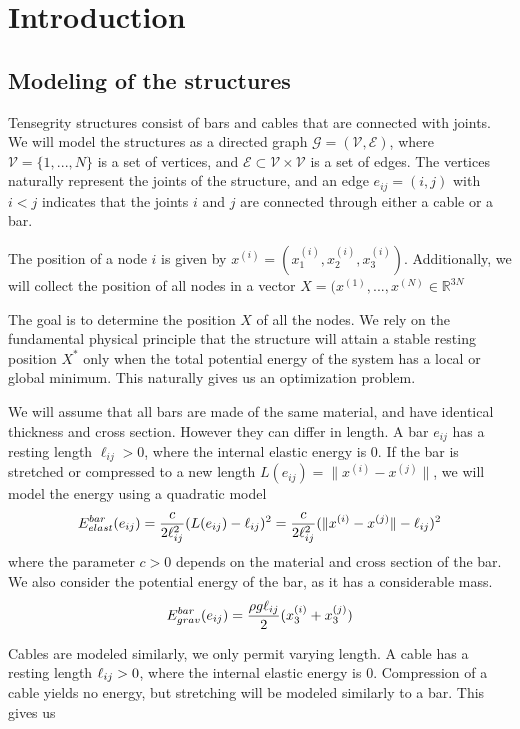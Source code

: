 \section{Introduction}
\subsection{Modeling of the structures}
Tensegrity structures consist of bars and cables that are connected with joints. We will model the structures as a directed graph $\mathcal{G} = (\mathcal{V},\mathcal{E})$, where $\mathcal{V} = \{1,...,N\}$ is a set of vertices, and $\mathcal{E} \subset \mathcal{V} \times \mathcal{V}$ is a set of edges. The vertices naturally represent the joints of the structure, and an edge $e_{ij} = (i,j)$ with $i < j$ indicates that the joints $i$ and $j$ are connected through either a cable or a bar.

The position of a node $i$ is given by $x^{(i)} = (x_1^{(i)},x_2^{(i)},x_3^{(i)})$. Additionally, we will collect the position of all nodes in a vector $X = (x^{(1)},...,x^{(N)} \in \mathbb{R}^{3N}$

The goal is to determine the position $X$ of all the nodes. We rely on the fundamental physical principle that the structure will attain a stable resting position $X^*$ only when the total potential energy of the system has a local or global minimum. This naturally gives us an optimization problem.

We will assume that all bars are made of the same material, and have identical thickness and cross section. However they can differ in length. A bar $e_{ij}$ has a resting length $\ell_{ij}>0$, where the internal elastic energy is $0$. If the bar is stretched or compressed to a new length $L(e_{ij})=\lVert x^{(i)} - x^{(j)}\rVert$, we will model the energy using a quadratic model
\begin{equation}
    E^{bar}_{elast}(e_{ij}) = \frac{c}{2\ell_{ij}^2}(L(e_{ij}) - \ell_{ij})^2 = \frac{c}{2 \ell_{ij}^2}(\lVert x^{(i)} - x^{(j)}\rVert - \ell_{ij})^2
    \label{barElast}
\end{equation}
where the parameter $c > 0$ depends on the material and cross section of the bar. We also consider the potential energy of the bar, as it has a considerable mass.
\begin{equation}
    E^{bar}_{grav}(e_{ij}) = \frac{\rho g \ell_{ij}}{2}(x_3^{(i)}+x_3^{(j)})
    \label{barGrav}
\end{equation}

Cables are modeled similarly, we only permit varying length. A cable has a resting length $\ell_{ij} > 0$, where the internal elastic energy is $0$. Compression of a cable yields no energy, but stretching will be modeled similarly to a bar. This gives us

